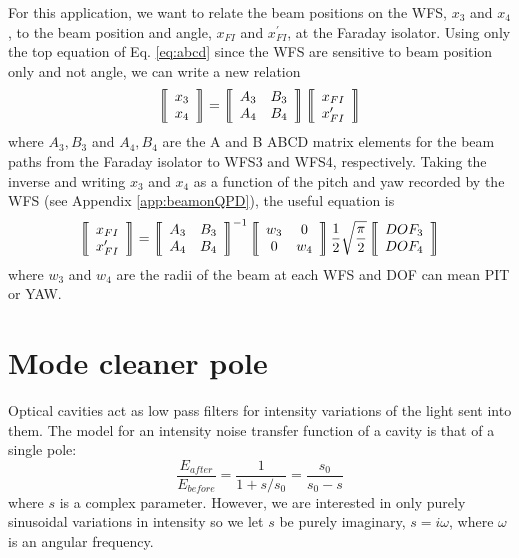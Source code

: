 For this application, we want to relate the beam positions on the WFS,
$x_{3}$ and $x_{4}$, to the beam position and angle, $x_{FI}$ and
$x^{\prime}_{FI}$, at the Faraday isolator. Using only the top
equation of Eq. \ref{eq:abcd} since the WFS are sensitive to beam
position only and not angle, we can write a new relation
\begin{equation}
\left \llbracket \begin{array}{c} 
x_3 \\
x_4 \end{array} \right\rrbracket =
\left\llbracket \begin{array}{c c}
A_3 & B_3 \\
A_4 & B_4 \end{array} \right\rrbracket
\left \llbracket \begin{array}{c} 
x_{FI} \\
x^{\prime}_{FI} \end{array} \right\rrbracket
\end{equation}
where ${A_3, B_3}$ and ${A_4, B_4}$ are the A and B ABCD matrix
elements for the beam paths from the Faraday isolator to WFS3 and
WFS4, respectively. Taking the inverse and writing $x_3$ and $x_4$ as
a function of the pitch and yaw recorded by the WFS (see Appendix
\ref{app:beamonQPD}), the useful equation is
\begin{equation}
\left \llbracket \begin{array}{c} 
x_{FI} \\
x^{\prime}_{FI} \end{array} \right\rrbracket =
\left\llbracket \begin{array}{c c}
A_3 & B_3 \\
A_4 & B_4 \end{array} \right\rrbracket^{-1}
\left\llbracket \begin{array}{c c}
w_3 & 0 \\
0 & w_4 \end{array} \right\rrbracket
\frac{1}{2} \sqrt{\frac{\pi}{2}} 
\left \llbracket \begin{array}{c} 
DOF_3 \\
DOF_4 \end{array} \right\rrbracket
\end{equation}
where $w_3$ and $w_4$ are the radii of the beam at each WFS and
DOF can mean PIT or YAW.




\section{Mode cleaner pole}
\label{sec:MCpole}
Optical cavities act as low pass filters for intensity variations of
the light sent into them. The model for an intensity noise transfer
function of a cavity is that of a single pole:
\begin{equation}
\frac{E_{after}}{E_{before}} = \frac{1}{1 + s/s_0} = \frac{s_0}{s_0 - s}
\end{equation}
where $s$ is a complex parameter. However, we are interested in only
purely sinusoidal variations in intensity so we let $s$ be purely
imaginary, $s=i\omega$, where $\omega$ is an angular frequency.


